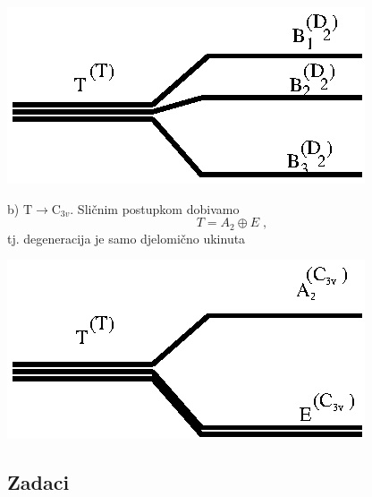 \begin{primjer}
\centerline{\includegraphics[scale=1.0]{pics/splittingT.eps}}

b) $\mathrm{T}\to \mathrm{C}_{3v}$. Sličnim postupkom dobivamo
\begin{displaymath}
        T = A_2 \oplus E \;,
\end{displaymath}
tj. degeneracija je samo djelomično ukinuta

\centerline{\includegraphics[scale=1.0]{pics/splittingT2.eps}}

\end{primjer}

\subsection*{Zadaci}

